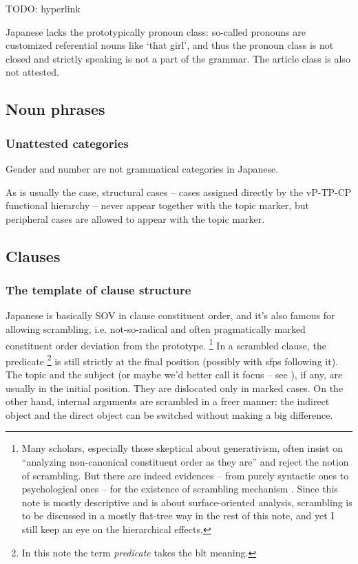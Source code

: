 \documentclass[UTF8, a4paper, oneside, scheme=plain]{ctexart}
\newcommand*{\term}[1]{\emph{#1}}
\newcommand{\translate}[1]{`#1'}
\begin{document}
TODO: hyperlink

Japanese lacks the prototypically pronoun class:
so-called pronouns are customized referential nouns like \translate{that girl},
and thus the pronoun class is not closed and strictly speaking is not a part of the grammar.
The article class is also not attested.

\subsection{Noun phrases}

\subsubsection{Unattested categories}

Gender and number are not grammatical categories in Japanese.



As is usually the case,
structural cases -- cases assigned directly by the vP-TP-CP functional hierarchy 
-- never appear together with the topic marker,
but peripheral cases are allowed to appear with the topic marker.

\subsection{Clauses}

\subsubsection{The template of clause structure}

Japanese is basically SOV in clause constituent order,
and it's also famous for allowing scrambling,
i.e. not-so-radical and often pragmatically marked constituent order deviation from the prototype.%
\footnote{
    Many scholars, especially those skeptical about generativism,
    often insist on ``analyzing non-canonical constituent order as they are''
    and reject the notion of scrambling.
    But there are indeed evidences -- from purely syntactic ones to psychological ones -- 
    for the existence of scrambling mechanism \citep{imamura2015effects,imamura2016processing,yatsushiro2003vp}.
    Since this note is mostly descriptive and is about surface-oriented analysis,
    scrambling is to be discussed in a mostly flat-tree way in the rest of this note,
    and yet I still keep an eye on the hierarchical effects.
}
In a scrambled clause, 
the predicate%
\footnote{
    In this note the term \term{predicate} takes the \ac{blt} meaning.
}
is still strictly at the final position 
(possibly with \acs{sfp}s following it).
The topic and the subject (or maybe we'd better call it focus -- see ), 
if any, are usually in the initial position.
They are dislocated only in marked cases.
On the other hand, 
internal arguments are scrambled in a freer manner:
the indirect object and the direct object can be switched without making a big difference.
\end{document}
